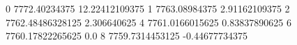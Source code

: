 0 7772.40234375 12.22412109375
1 7763.08984375 2.91162109375
2 7762.48486328125 2.306640625
4 7761.0166015625 0.83837890625
6 7760.17822265625 0.0
8 7759.7314453125 -0.44677734375
